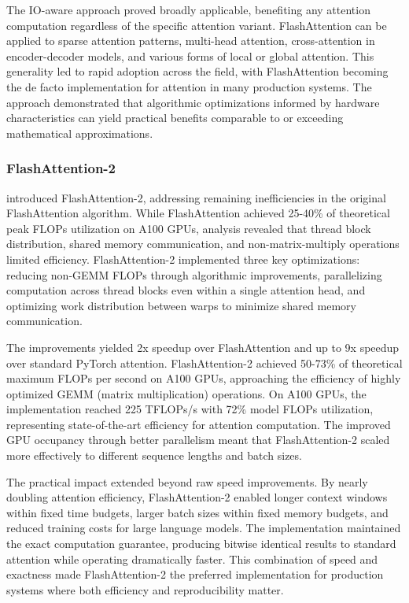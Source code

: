 The IO-aware approach proved broadly applicable, benefiting any attention computation regardless of the specific attention variant. FlashAttention can be applied to sparse attention patterns, multi-head attention, cross-attention in encoder-decoder models, and various forms of local or global attention. This generality led to rapid adoption across the field, with FlashAttention becoming the de facto implementation for attention in many production systems. The approach demonstrated that algorithmic optimizations informed by hardware characteristics can yield practical benefits comparable to or exceeding mathematical approximations.

\subsubsection{FlashAttention-2}

\citet{dao2023flashattention2} introduced FlashAttention-2, addressing remaining inefficiencies in the original FlashAttention algorithm. While FlashAttention achieved 25-40\% of theoretical peak FLOPs utilization on A100 GPUs, analysis revealed that thread block distribution, shared memory communication, and non-matrix-multiply operations limited efficiency. FlashAttention-2 implemented three key optimizations: reducing non-GEMM FLOPs through algorithmic improvements, parallelizing computation across thread blocks even within a single attention head, and optimizing work distribution between warps to minimize shared memory communication.

The improvements yielded 2x speedup over FlashAttention and up to 9x speedup over standard PyTorch attention. FlashAttention-2 achieved 50-73\% of theoretical maximum FLOPs per second on A100 GPUs, approaching the efficiency of highly optimized GEMM (matrix multiplication) operations. On A100 GPUs, the implementation reached 225 TFLOPs/s with 72\% model FLOPs utilization, representing state-of-the-art efficiency for attention computation. The improved GPU occupancy through better parallelism meant that FlashAttention-2 scaled more effectively to different sequence lengths and batch sizes.

The practical impact extended beyond raw speed improvements. By nearly doubling attention efficiency, FlashAttention-2 enabled longer context windows within fixed time budgets, larger batch sizes within fixed memory budgets, and reduced training costs for large language models. The implementation maintained the exact computation guarantee, producing bitwise identical results to standard attention while operating dramatically faster. This combination of speed and exactness made FlashAttention-2 the preferred implementation for production systems where both efficiency and reproducibility matter.

